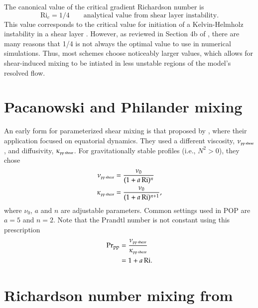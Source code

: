The canonical value of the critical gradient Richardson number is
\begin{equation}
 \mbox{Ri}_{c} =1/4   \qquad \mbox{analytical value from shear layer instability.} 
\end{equation}
This value corresponds to the critical value for initiation of a
Kelvin-Helmholz instability in a shear layer \citep{miles1961}.
However, as reviewed in Section 4b of \cite{Jacksonetal2008}, there
are many reasons that 1/4 is not always the optimal value to use in
numerical simulations.  Thus, most schemes choose noticeably larger
values, which allows for shear-induced mixing to be intiated in less
unstable regions of the model's resolved flow.




\section{Pacanowski and Philander mixing}
\label{section:shear-instability-parameterized-ppvmix}

An early form for parameterized shear mixing is that proposed by
\cite{PPvmix}, where their application focused on equatorial dynamics.
They used a different viscosity, $\nu_{\mbox{\tiny pp shear}}$, and
diffusivity, $\kappa_{\mbox{\tiny pp shear}}$.  For gravitationally
stable profiles (i.e., $N^{2} > 0$), they chose
\begin{align}
 \nu_{\mbox{\tiny pp shear}}&= \frac{\nu_{0}}{(1 + a  \, \mbox{Ri})^{n}} 
\\
 \kappa_{\mbox{\tiny pp shear}}&= \frac{\nu_{0}}{(1 + a  \, \mbox{Ri})^{n+1}}, 
\end{align}
where $\nu_{0}$, $a$ and $n$ are adjustable parameters.  Common
settings used in POP are $a=5$ and $n=2$.  Note that the Prandtl
number is not constant using this prescription
\begin{subequations}
\begin{align}
  \mbox{Pr}_{\mbox{\scriptsize pp}} &= \frac{\nu_{\mbox{\tiny pp shear}}}{\kappa_{\mbox{\tiny pp  shear}}} 
 \\
 &= 1 + a  \, \mbox{Ri}.
\end{align}
\end{subequations}


\section{Richardson number mixing from \cite{LargeKPP}}
\label{section:shear-instability-parameterized-kpp}

